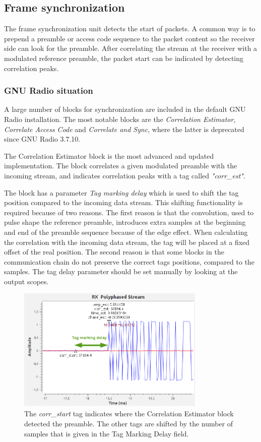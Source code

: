 \subsection{Frame synchronization}
The frame synchronization unit detects the start of packets. A common way is to prepend a preamble or access code sequence to the packet content so the receiver side can look for the preamble. After correlating the stream at the receiver with a modulated reference preamble, the packet start can be indicated by detecting correlation peaks.
\subsubsection{GNU Radio situation}
A large number of blocks for synchronization are included in the default GNU Radio installation. The most notable blocks are the \textit{Correlation Estimator}, \textit{Correlate Access Code} and \textit{Correlate and Sync}, where the latter is deprecated since GNU Radio 3.7.10. \medskip


The Correlation Estimator block is the most advanced and updated implementation. The block correlates a given modulated preamble with the incoming stream, and indicates correlation peaks with a tag called \textit{"corr\_est"}. \medskip

The block has a parameter \textit{Tag marking delay} which is used to shift the tag position compared to the incoming data stream. This shifting functionality is required because of two reasons. The first reason is that the convolution, used to pulse shape the reference preamble, introduces extra samples at the beginning and end of the preamble sequence because of the edge effect. When calculating the correlation with the incoming data stream, the tag will be placed at a fixed offset of the real position. The second reason is that some blocks in the communication chain do not preserve the correct tags positions, compared to the samples. The tag delay parameter should be set manually by looking at the output scopes.\medskip

\begin{figure}[H]
    \centering
    \includegraphics[width=0.8\textwidth]{img_commchain/tag_marking_delay2.png}
    \caption{The \textit{corr\_start} tag indicates where the Correlation Estimator block detected the preamble. The other tags are shifted by the number of samples that is given in the Tag Marking Delay field.}
    \label{fig:tag_marking_delay2}
\end{figure}

